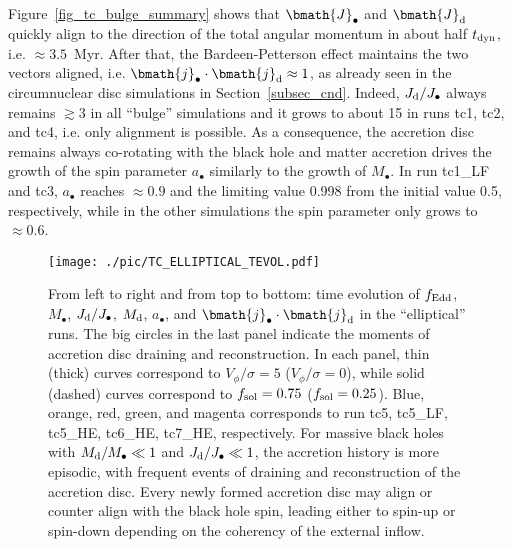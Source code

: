 \documentclass[a4paper,fleqn,usenatbib]{mnras}
\begin{document}
Figure~\ref{fig_tc_bulge_summary} shows that $\bmath{J}_{\bullet}$ and $\bmath{J}_{\rm d}$ quickly align to the direction of the total angular momentum in about half $t_{\rm dyn}$, i.e. $\approx 3.5$~Myr.
After that, the Bardeen-Petterson effect maintains the two vectors aligned, i.e. $\bmath{j}_{\bullet} \cdot \bmath{j}_{\rm d} \approx 1$, as already seen in the circumnuclear disc simulations in Section~\ref{subsec_cnd}.
Indeed, $J_{\rm d} / J_{\bullet}$ always remains $\gtrsim 3$ in all ``bulge'' simulations and it grows to about 15 in runs tc1, tc2, and tc4, i.e. only alignment is possible.
As a consequence, the accretion disc remains always co-rotating with the black hole and matter accretion drives the growth of the spin parameter $a_{\bullet}$ similarly to the growth of $M_{\bullet}$.
In run tc1\_LF and tc3, $a_{\bullet}$ reaches $\approx 0.9$ and the limiting value 0.998 from the initial value 0.5, respectively, while in the other simulations the spin parameter only grows to $\approx 0.6$.

\begin{figure*}
\begin{center}
\texttt{[image: ./pic/TC\_ELLIPTICAL\_TEVOL.pdf]}
\caption{From left to right and from top to bottom: time evolution of $f_{\rm Edd}$, $M_{\bullet}$, $J_{\rm d}/J_{\bullet}$, $M_{\rm d}$, $a_{\bullet}$, and $\bmath{j}_{\bullet} \cdot \bmath{j}_{\rm d}$ in the ``elliptical'' runs.
The big circles in the last panel indicate the moments of accretion disc draining and reconstruction.
In each panel, thin (thick) curves correspond to $V_{\phi}/\sigma=5$ ($V_{\phi}/\sigma=0$), while solid (dashed) curves correspond to $f_{\rm sol}=0.75$ ($f_{\rm sol}=0.25$).
Blue, orange, red, green, and magenta corresponds to run tc5, tc5\_LF, tc5\_HE, tc6\_HE, tc7\_HE, respectively.
For massive black holes with $M_{\rm d}/M_{\bullet} \ll 1$ and $J_{\rm d}/J_{\bullet} \ll 1$, the accretion history is more episodic, with frequent events of draining and reconstruction of the accretion disc.
Every newly formed accretion disc may align or counter align with the black hole spin, leading either to spin-up or spin-down depending on the coherency of the external inflow.
}
\label{fig_tc_elliptical_summary}
\end{center}
\end{figure*}
\end{document}
